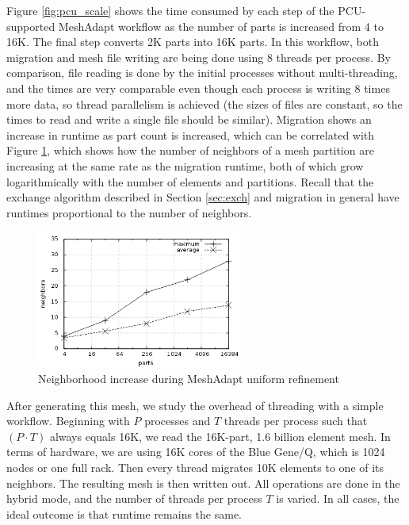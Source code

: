 Figure \ref{fig:pcu_scale} shows the time consumed by each step of the
PCU-supported MeshAdapt workflow as the number of parts is increased from 4 to
16K.
The final step converts 2K parts into 16K parts.
In this workflow, both migration and mesh file writing are being
done using 8 threads per process.
By comparison, file reading is done by the initial processes
without multi-threading,
and the times are very comparable even though each process
is writing 8 times more data, so thread parallelism is achieved
(the sizes of files are constant, so the times to read and write
a single file should be similar).
Migration shows an increase in runtime as part count is
increased, which can be correlated with Figure \ref{fig:neighbor}, which
shows how the number of neighbors of a mesh partition
are increasing at the same rate as the migration runtime,
both of which grow logarithmically with the number of elements and partitions.
Recall that the exchange algorithm described in Section \ref{sec:exch}
and migration in general have runtimes proportional to the number
of neighbors.

\begin{figure}[!ht]
\begin{center}
\caption{Neighborhood increase during MeshAdapt uniform refinement}
\label{fig:neighbor}
\includegraphics[width=0.6\textwidth]{pcu_neighbor.png}
\end{center}
\end{figure}

After generating this mesh, we study the overhead of threading with
a simple workflow.
Beginning with $P$ processes and $T$ threads per process
such that $(P\cdot T)$ always equals 16K, we read the 16K-part,
1.6 billion element mesh.
In terms of hardware, we are using 16K cores of the Blue Gene/Q,
which is 1024 nodes or one full rack.
Then every thread migrates 10K elements to one of its
neighbors.
The resulting mesh is then written out.
All operations are done in the hybrid mode, and the
number of threads per process $T$ is varied.
In all cases, the ideal outcome is that runtime
remains the same.

